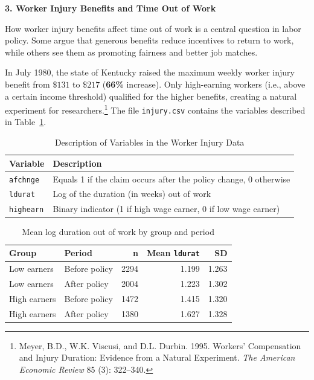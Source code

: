 \documentclass[12pt]{article}
\begin{document}
\vspace{0.5cm}


\begin{center}
    \textbf{\large 3. Worker Injury Benefits and Time Out of Work}    
\end{center}

How worker injury benefits affect time out of work is a central question in labor policy. Some argue that generous benefits reduce incentives to return to work, while others see them as promoting fairness and better job matches. 

In July 1980, the state of Kentucky raised the maximum weekly worker injury benefit from $\$131$ to $\$217$ (\textbf{66\%} increase). Only high-earning workers (i.e., above a certain income threshold) qualified for the higher benefits, creating a natural experiment for researchers.\footnote{Meyer, B.D., W.K. Viscusi, and D.L. Durbin. 1995. Workers’ Compensation and Injury Duration: Evidence from a Natural Experiment. \emph{The American Economic Review} 85 (3): 322–340.} The file \texttt{injury.csv} contains the variables described in Table~\ref{tab:injury-data}.

\begin{table}[H]
\centering
\caption{Description of Variables in the Worker Injury Data}\label{tab:injury-data}
\begin{tabular}{ll}
\toprule
\textbf{Variable} & \textbf{Description} \\
\midrule
\texttt{afchnge} & Equals 1 if the claim occurs after the policy change, 0 otherwise \\
\texttt{ldurat}  & Log of the duration (in weeks) out of work \\
\texttt{highearn}& Binary indicator (1 if high wage earner, 0 if low wage earner) \\
\bottomrule
\end{tabular}
\end{table}

\begin{table}[H]
\centering
\caption{Mean log duration out of work by group and period}\label{tab:injury-means}
\begin{tabular}{llrrr}
\toprule
\textbf{Group} & \textbf{Period} & \textbf{n} & \textbf{Mean \texttt{ldurat}} & \textbf{SD} \\
\midrule
Low earners & Before policy & 2294 & 1.199 & 1.263 \\
Low earners & After policy & 2004 & 1.223 & 1.302 \\
High earners & Before policy & 1472 & 1.415 & 1.320 \\
High earners & After policy & 1380 & 1.627 & 1.328 \\
\bottomrule
\end{tabular}
\end{table}
\end{document}
